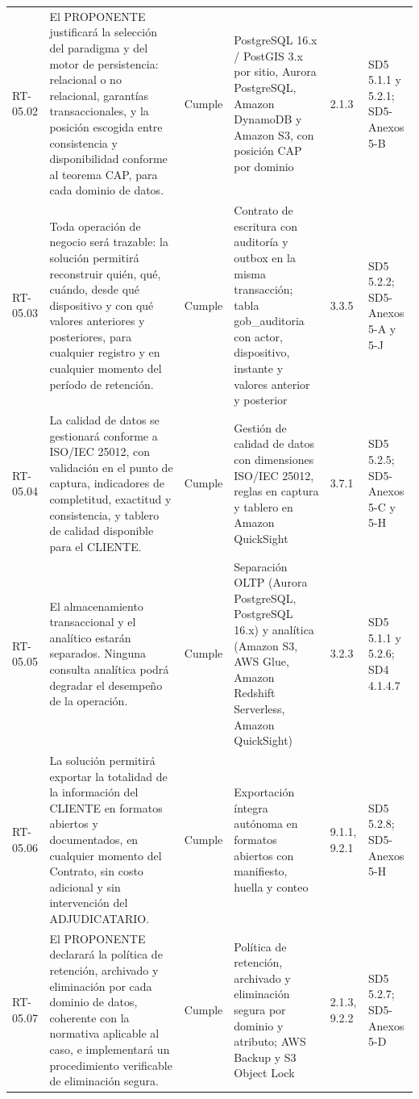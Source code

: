 \documentclass[carta,firma,final]{lafrox}
\begin{document}
\begin{landscape}
{\begin{longtable}{@{}F{0.070} F{0.255} F{0.075} F{0.280} F{0.090} F{0.230}@{}}
  RT-05.02 & El PROPONENTE justificará la selección del paradigma y del motor de persistencia: relacional o no relacional, garantías transaccionales, y la posición escogida entre consistencia y disponibilidad conforme al teorema CAP, para cada dominio de datos. & Cumple & PostgreSQL 16.x / PostGIS 3.x por sitio, Aurora PostgreSQL, Amazon DynamoDB y Amazon S3, con posición CAP por dominio & 2.1.3 & SD5 5.1.1 y 5.2.1; SD5-Anexos 5-B \\
  RT-05.03 & Toda operación de negocio será trazable: la solución permitirá reconstruir quién, qué, cuándo, desde qué dispositivo y con qué valores anteriores y posteriores, para cualquier registro y en cualquier momento del período de retención. & Cumple & Contrato de escritura con auditoría y outbox en la misma transacción; tabla gob\_auditoria con actor, dispositivo, instante y valores anterior y posterior & 3.3.5 & SD5 5.2.2; SD5-Anexos 5-A y 5-J \\
  RT-05.04 & La calidad de datos se gestionará conforme a ISO/IEC 25012, con validación en el punto de captura, indicadores de completitud, exactitud y consistencia, y tablero de calidad disponible para el CLIENTE. & Cumple & Gestión de calidad de datos con dimensiones ISO/IEC 25012, reglas en captura y tablero en Amazon QuickSight & 3.7.1 & SD5 5.2.5; SD5-Anexos 5-C y 5-H \\
  RT-05.05 & El almacenamiento transaccional y el analítico estarán separados. Ninguna consulta analítica podrá degradar el desempeño de la operación. & Cumple & Separación OLTP (Aurora PostgreSQL, PostgreSQL 16.x) y analítica (Amazon S3, AWS Glue, Amazon Redshift Serverless, Amazon QuickSight) & 3.2.3 & SD5 5.1.1 y 5.2.6; SD4 4.1.4.7 \\
  RT-05.06 & La solución permitirá exportar la totalidad de la información del CLIENTE en formatos abiertos y documentados, en cualquier momento del Contrato, sin costo adicional y sin intervención del ADJUDICATARIO. & Cumple & Exportación íntegra autónoma en formatos abiertos con manifiesto, huella y conteo & 9.1.1, 9.2.1 & SD5 5.2.8; SD5-Anexos 5-H \\
  RT-05.07 & El PROPONENTE declarará la política de retención, archivado y eliminación por cada dominio de datos, coherente con la normativa aplicable al caso, e implementará un procedimiento verificable de eliminación segura. & Cumple & Política de retención, archivado y eliminación segura por dominio y atributo; AWS Backup y S3 Object Lock & 2.1.3, 9.2.2 & SD5 5.2.7; SD5-Anexos 5-D \\

\end{longtable}}
\end{landscape}
\end{document}
